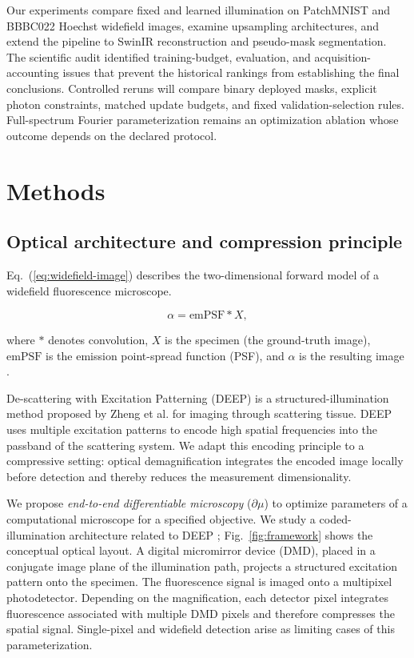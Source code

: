\documentclass{optica-article}
\begin{document}
Our experiments compare fixed and learned illumination on PatchMNIST and BBBC022 Hoechst widefield images, examine upsampling architectures, and extend the pipeline to SwinIR reconstruction and pseudo-mask segmentation. The scientific audit identified training-budget, evaluation, and acquisition-accounting issues that prevent the historical rankings from establishing the final conclusions. Controlled reruns will compare binary deployed masks, explicit photon constraints, matched update budgets, and fixed validation-selection rules. Full-spectrum Fourier parameterization remains an optimization ablation whose outcome depends on the declared protocol.

\section{Methods}

\subsection{Optical architecture and compression principle}

Eq.~(\ref{eq:widefield-image}) describes the two-dimensional forward model of a widefield fluorescence microscope.

\begin{equation}
\alpha = \mathrm{emPSF} * X,
\label{eq:widefield-image}
\end{equation}

where $*$ denotes convolution, $X$ is the specimen (the ground-truth image), $\mathrm{emPSF}$ is the emission point-spread function (PSF), and $\alpha$ is the resulting image \cite{marian2005measurement}.

De-scattering with Excitation Patterning (DEEP) is a structured-illumination method proposed by Zheng et al. \cite{zheng2021scattering} for imaging through scattering tissue. DEEP uses multiple excitation patterns to encode high spatial frequencies into the passband of the scattering system. We adapt this encoding principle to a compressive setting: optical demagnification integrates the encoded image locally before detection and thereby reduces the measurement dimensionality.

We propose \textit{end-to-end differentiable microscopy} ($\partial \mu$) to optimize parameters of a computational microscope for a specified objective. We study a coded-illumination architecture related to DEEP \cite{zheng2021scattering}; Fig.~\ref{fig:framework} shows the conceptual optical layout. A digital micromirror device (DMD), placed in a conjugate image plane of the illumination path, projects a structured excitation pattern onto the specimen. The fluorescence signal is imaged onto a multipixel photodetector. Depending on the magnification, each detector pixel integrates fluorescence associated with multiple DMD pixels and therefore compresses the spatial signal. Single-pixel and widefield detection arise as limiting cases of this parameterization.
\end{document}
